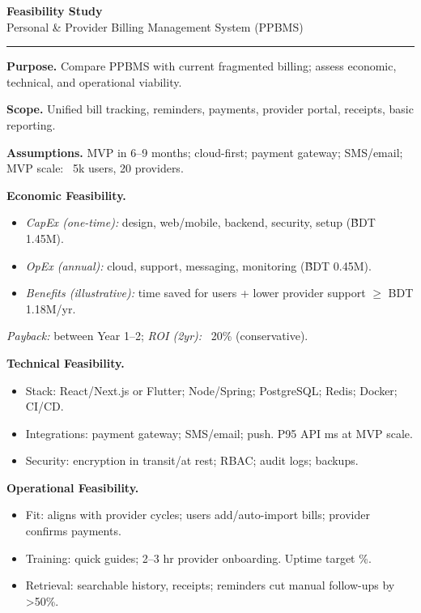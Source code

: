 \documentclass[12pt,a4paper]{article}
\begin{document}
\begin{center}
\textbf{Feasibility Study}\\
\small Personal \& Provider Billing Management System (PPBMS)
\end{center}\vspace{0.5em}\hrule\vspace{0.6em}
\textbf{Purpose.} Compare PPBMS with current fragmented billing; assess economic, technical, and operational viability.

\textbf{Scope.} Unified bill tracking, reminders, payments, provider portal, receipts, basic reporting.

\textbf{Assumptions.} MVP in 6--9 months; cloud-first; payment gateway; SMS/email; MVP scale: ~5k users, 20 providers.

\textbf{Economic Feasibility.}
\begin{itemize}
  \item \emph{CapEx (one-time):} design, web/mobile, backend, security, setup (\~BDT 1.45M).
  \item \emph{OpEx (annual):} cloud, support, messaging, monitoring (\~BDT 0.45M).
  \item \emph{Benefits (illustrative):} time saved for users + lower provider support \(\geq\) BDT 1.18M/yr.
\end{itemize}
\noindent\textit{Payback:} between Year 1--2; \textit{ROI (2yr):} ~20\% (conservative).

\textbf{Technical Feasibility.}
\begin{itemize}
  \item Stack: React/Next.js or Flutter; Node/Spring; PostgreSQL; Redis; Docker; CI/CD.
  \item Integrations: payment gateway; SMS/email; push. P95 API  ms at MVP scale.
  \item Security: encryption in transit/at rest; RBAC; audit logs; backups.
\end{itemize}

\textbf{Operational Feasibility.}
\begin{itemize}
  \item Fit: aligns with provider cycles; users add/auto-import bills; provider confirms payments.
  \item Training: quick guides; 2--3 hr provider onboarding. Uptime target \%.
  \item Retrieval: searchable history, receipts; reminders cut manual follow-ups by >50\%.
\end{itemize}
\end{document}
